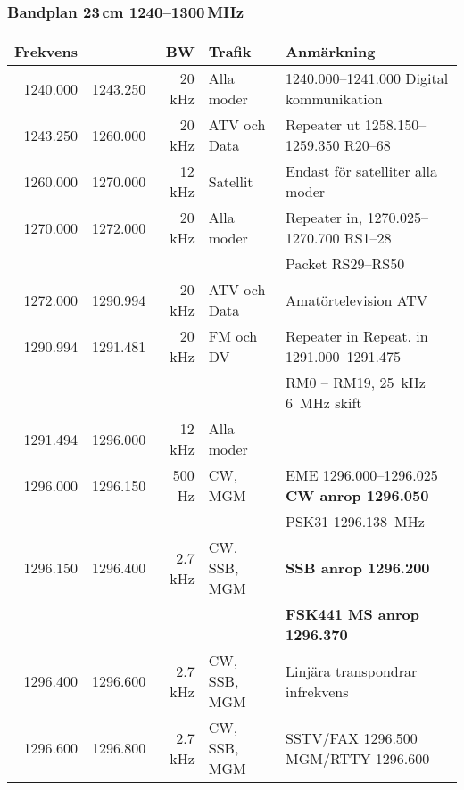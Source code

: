 \subsubsection{Bandplan 23\,cm 1240--1300\,MHz}
\begin{tabular}{rrrll}
	\textbf{Frekvens} &          & \textbf{BW} & \textbf{Trafik} & \textbf{Anmärkning}          \\ \hline
        
1240.000 & 1243.250 & 20 kHz  & Alla moder   & \numrange{1240,000}{1241,000} Digital kommunikation  \\ \hline
1243.250 & 1260.000 & 20 kHz  & ATV och Data & Repeater ut \numrange{1258,150}{1259,350}  R20--68   \\ \hline
1260.000 & 1270.000 & 12 kHz  & Satellit     & Endast för satelliter alla moder                     \\ \hline
1270.000 & 1272.000 & 20 kHz  & Alla moder   & Repeater in, \numrange{1270,025}{1270,700} RS1--28   \\
	     &          &         &              & Packet RS29--RS50                                    \\ \hline
1272.000 & 1290.994 & 20 kHz  & ATV och Data & Amatörtelevision ATV                                 \\ \hline
1290.994 & 1291.481 & 20 kHz  & FM och DV    & Repeater in Repeat. in \numrange{1291,000}{1291,475} \\
	     &          &         &              & RM0 – RM19, \SI{25}{kHz} \SI{6}{MHz} skift          \\ \hline
1291.494 & 1296.000 & 12 kHz  & Alla moder   &                                                      \\ \hline
1296.000 & 1296.150 & 500 Hz  & CW,  MGM     & EME \numrange{1296,000}{1296,025} \textbf{CW anrop 1296.050}        \\
	     &          &         &              & PSK31 \SI{1296,138}{MHz}                                   \\ \hline
1296.150 & 1296.400 & 2.7 kHz & CW, SSB, MGM & \textbf{SSB anrop \num{1296,200}}                          \\
	     &          &         &              & \textbf{FSK441 MS anrop \num{1296,370}}                    \\ \hline
1296.400 & 1296.600 & 2.7 kHz & CW, SSB, MGM & Linjära transpondrar infrekvens                      \\ \hline
1296.600 & 1296.800 & 2.7 kHz & CW, SSB, MGM & SSTV/FAX \num{1296,500} MGM/RTTY \num{1296,600}                 \\ \hline

\end{tabular}
